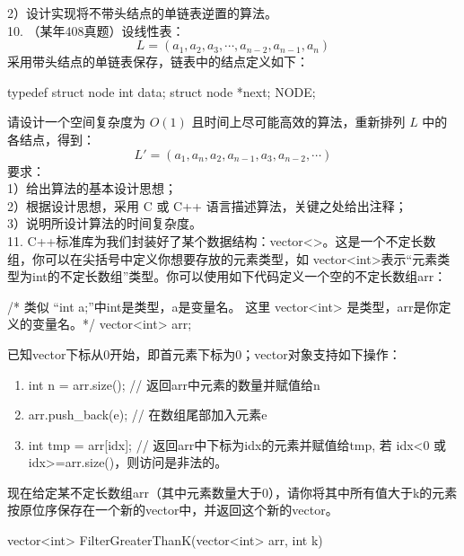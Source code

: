 2）设计实现将不带头结点的单链表逆置的算法。\\


10. （某年408真题）设线性表：
$$ L=(a_1,a_2,a_3,\cdots,a_{n-2},a_{n-1},a_n) $$
采用带头结点的单链表保存，链表中的结点定义如下：
\begin{cppcode}
    typedef struct node
    {
        int data;
        struct node *next;
    }NODE;
\end{cppcode}

请设计一个空间复杂度为 \(O(1)\) 且时间上尽可能高效的算法，重新排列 \(L\) 中的各结点，得到：
$$ L'=(a_1,a_n,a_2,a_{n-1},a_3,a_{n-2},\cdots) $$
要求：\\
1）给出算法的基本设计思想；\\
2）根据设计思想，采用 C 或 C++ 语言描述算法，关键之处给出注释；\\
3）说明所设计算法的时间复杂度。\\


11. C++标准库为我们封装好了某个数据结构：vector<>。这是一个不定长数组，你可以在尖括号中定义你想要存放的元素类型，如
vector<int>表示“元素类型为int的不定长数组”类型。你可以使用如下代码定义一个空的不定长数组arr：
\begin{cppcode}
    /* 类似 “int a;”中int是类型，a是变量名。
    这里 vector<int> 是类型，arr是你定义的变量名。*/
    vector<int> arr;
\end{cppcode}
已知vector下标从0开始，即首元素下标为0；vector对象支持如下操作：
\begin{enumerate}[label=\arabic*）]
    \item int n = arr.size();   // 返回arr中元素的数量并赋值给n
    \item arr.push\_back(e); // 在数组尾部加入元素e
    \item int tmp = arr[idx]; // 返回arr中下标为idx的元素并赋值给tmp, 若 idx<0 或 idx>=arr.size()，则访问是非法的。
\end{enumerate}

现在给定某不定长数组arr（其中元素数量大于0），请你将其中所有值大于k的元素按原位序保存在一个新的vector中，并返回这个新的vector。
\begin{cppcode}
    vector<int> FilterGreaterThanK(vector<int> arr, int k) {

    }
\end{cppcode}



